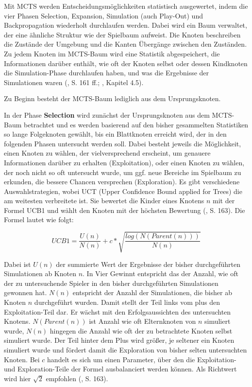 
Mit MCTS werden Entscheidungsmöglichkeiten statistisch ausgewertet, indem die vier Phasen Selection, Expansion, Simulation (auch Play-Out) und Backpropagation wiederholt durchlaufen werden. Dabei wird ein Baum verwaltet, der eine ähnliche Struktur wie der Spielbaum aufweist. Die Knoten beschreiben die Zustände der Umgebung und die Kanten Übergänge zwischen den Zuständen. Zu jedem Knoten im MCTS-Baum wird eine Statistik abgespeichert, die Informationen darüber enthält, wie oft der Knoten selbst oder dessen Kindknoten die Simulation-Phase durchlaufen haben, und was die Ergebnisse der Simulationen waren (\cite{Russell.2020}, S. 161 ff.; \cite{Ferguson.January2019}, Kapitel 4.5).

Zu Beginn besteht der MCTS-Baum lediglich aus dem Ursprungsknoten.

In der Phase \textbf{Selection} wird zunächst der Ursprungsknoten aus dem MCTS-Baum betrachtet und es werden basierend auf den bisher gesammelten Statistiken so lange Folgeknoten gewählt, bis ein Blattknoten erreicht wird, der in den folgenden Phasen untersucht werden soll. Dabei besteht jeweils die Möglichkeit, einen Knoten zu wählen, der vielversprechend erscheint, um genauere Informationen darüber zu erhalten (Exploitation), oder einen Knoten zu wählen, der noch nicht so oft untersucht wurde, um ggf. neue Bereiche im Spielbaum zu erkunden, die bessere Chancen versprechen (Exploration). Es gibt verschiedene Auswahlstrategien, wobei UCT (Upper Confidence Bound applied for Trees) die am weitesten verbreitete ist. Sie bewertet die Kinder eines Knotens $n$ mit der Formel UCB1 und wählt den Knoten mit der höchsten Bewertung (\cite{Russell.2020}, S. 163). Die Formel lautet wie folgt:

\begin{equation*}
	UCB1 = \frac{U(n)}{N(n)} + c * \sqrt{\frac{log(N(Parent(n)))}{N(n)}}
\end{equation*}

Dabei ist $U(n)$ der summierte Wert der Ergebnisse der bisher durchgeführten Simulationen ab Knoten $n$. In Vier Gewinnt entspricht das der Anzahl, wie oft der zu untersuchende Spieler in den bisher durchgeführten Simulationen gewonnen hat. $N(n)$ entspricht der Anzahl der Simulationen, die bisher ab Knoten $n$ durchgeführt wurden. Damit stellt der Teil links vom plus den Exploitation-Teil dar. Er wächst mit den Erfolgsaussichten des untersuchten Knotens.
$N(Parent(n))$ ist Anzahl wie oft Elternknoten von $n$ simuliert wurde, $N(n)$ hingegen die Anzahl wie oft der zu betrachtete Knoten selbst simuliert wurde. Der Teil hinter dem Plus wird größer, je seltener ein Knoten simuliert wurde und fördert damit die Exploration von bisher selten untersuchten Knoten.
Bei $c$ handelt es sich um einen Parameter, über den die Exploitation- und Exploration-Teile der Formel ausbalanciert werden können. Als Richtwert wird hier $\sqrt{2}$ empfohlen (\cite{Russell.2020}, S. 163).

